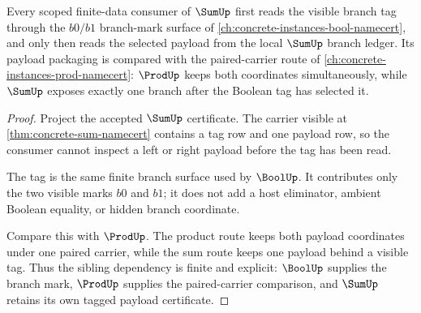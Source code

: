\begin{theorem}
\label{thm:sum-finite-data-sibling-dependency-route}
Every scoped finite-data consumer of $\SumUp$ first reads the visible branch
tag through the $b0/b1$ branch-mark surface of
\autoref{ch:concrete-instances-bool-namecert}, and only then reads the
selected payload from the local $\SumUp$ branch ledger. Its payload packaging
is compared with the paired-carrier route of
\autoref{ch:concrete-instances-prod-namecert}: $\ProdUp$ keeps both
coordinates simultaneously, while $\SumUp$ exposes exactly one branch after
the Boolean tag has selected it.
\end{theorem}
\begin{proof}
Project the accepted $\SumUp$ certificate. The carrier visible at
\autoref{thm:concrete-sum-namecert} contains a tag row and one payload row, so
the consumer cannot inspect a left or right payload before the tag has been
read.

The tag is the same finite branch surface used by $\BoolUp$. It contributes
only the two visible marks $b0$ and $b1$; it does not add a host eliminator,
ambient Boolean equality, or hidden branch coordinate.

Compare this with $\ProdUp$. The product route keeps both payload coordinates
under one paired carrier, while the sum route keeps one payload behind a
visible tag. Thus the sibling dependency is finite and explicit: $\BoolUp$
supplies the branch mark, $\ProdUp$ supplies the paired-carrier comparison,
and $\SumUp$ retains its own tagged payload certificate.
\end{proof}
